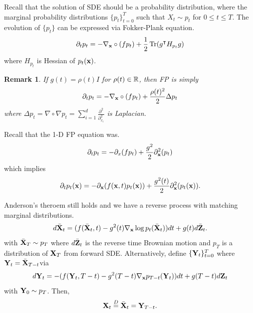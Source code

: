 \documentclass[11pt]{article}
\newtheorem{remark}{Remark}
\begin{document}
Recall that the solution of SDE should be a probability distribution,
where the marginal probability distributions $\{p_t\}_{t=0}^T$ such that $X_t\sim p_t$ for $0\leq t\leq T$.
The evolution of $\{p_t\}$ can be expressed via Fokker-Plank equation.
\begin{align}
    \partial_t p_t = -\nabla_{{\bf x}}\circ(fp_t) + \frac{1}{2} \operatorname{Tr}(g^\intercal H_{p_t} g)
\end{align}
where $H_{p_t}$ is Hessian of $p_t({\bf x})$.

\begin{remark}
    If $g(t) = \rho(t) I$ for $\rho(t)\in\mathbb{R}$, then FP is simply 
    \begin{align}
        \partial_t p_t = -\nabla_{{\bf x}}\circ(fp_t) + \frac{\rho(t)^2}{2} \Delta p_t
    \end{align}
    where $\Delta p_t = \nabla\circ \nabla p_t = \sum_{i=1}^d \frac{\partial^2}{\partial_{x_i}^2}$ is Laplacian.
\end{remark}

Recall that the 1-D FP equation was.
\begin{align}
    \partial_t p_t = -\partial_x(fp_t) + \frac{g^2}{2}\partial_{\bf x}^2 (p_t)
\end{align}
which implies
\begin{align}
    \partial_t p_t({\bf x}) = -\partial_{\bf x}(f({\bf x}, t)p_t({\bf x})) + \frac{g^2(t)}{2}\partial_{\bf x}^2 (p_t({\bf x})).
\end{align}

Anderson's theroem still holds and we have a reverse process with matching marginal distributions.
\begin{align}
    d\bar{{\bf X}}_t = (f(\bar{{\bf X}}_t, t) - g^2(t) \nabla_{\bf x}\log p_t(\bar{{\bf X}}_t))dt+g(t) d\bar{{\bf Z}}_t.
\end{align}
with $\bar{{\bf X}}_T\sim p_T$ where $d\bar{{\bf Z}}_t$ is the reverse time Brownian motion and $p_T$ is a distribution of ${\bf X}_T$ from forward SDE.
Alternatively, define $\{{\bf Y}_t\}_{t=0}^T$ where ${\bf Y}_t= \bar{{\bf X}}_{T-t}$via
\begin{align}
    d{\bf Y}_t =  - (f({\bf Y}_t, T-t) - g^2(T-t)\nabla_{\bf x} p_{T-t}({\bf Y}_t))dt + g(T-t)d{\bf Z}_t
\end{align}
with ${\bf Y}_0\sim p_T$.
Then,
\begin{align}
    {\bf X}_t \stackrel{D}{=} \bar{{\bf X}}_t ={\bf Y}_{T-t}.
\end{align}




\end{document}

